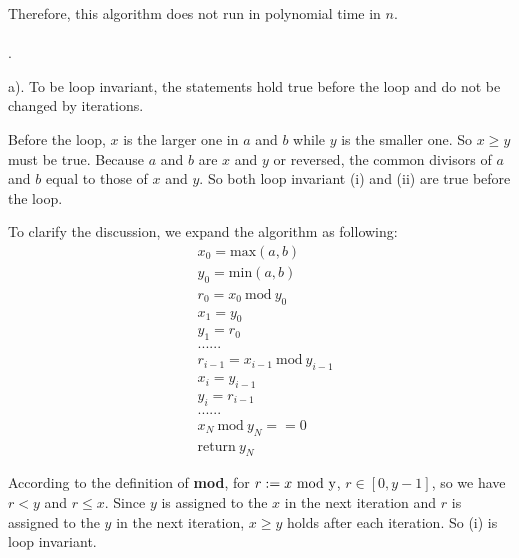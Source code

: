 \documentclass[twoside,11pt]{homework}
\begin{document}
Therefore, this algorithm does not run in polynomial time in $n$.
\\\\

.

\noindent a).
To be loop invariant, the statements hold true before the loop and do not be changed by iterations.

Before the loop, $x$ is the larger one in $a$ and $b$ while $y$ is the smaller one. So $x \ge y$ must be true. 
Because $a$ and $b$ are $x$ and $y$ or reversed, the common divisors of $a$ and $b$ equal to those of $x$ and $y$.
So both loop invariant (i) and (ii) are true before the loop.

To clarify the discussion, we expand the algorithm as following:
%
\begin{equation}
\begin{split}
&x_0 = \mathrm{max} (a, b)\\
&y_0 = \mathrm{min} (a, b)\\
&r_0 = x_0 \ \mathrm{mod}\  y_0\\
&x_1 = y_0\\
&y_1 = r_0\\
&......\\
&r_{i-1} = x_{i-1} \ \mathrm{mod}\ y_{i-1}\\
&x_i = y_{i-1}\\
&y_i = r_{i-1}\\
&......\\
&x_N\ \mathrm{mod}\ y_N == 0\\
&\mathrm{return}\ y_N
\end{split}
\end{equation}



According to the definition of \textbf{mod}, for $r := x\  \rm{mod}\ y$, $r \in [0, y-1]$, so we have $r < y$ and $r \le x$.
Since $y$ is assigned to the $x$ in the next iteration and $r$ is assigned to the $y$ in the next iteration, $x \ge y$ holds after each iteration.
So (i) is loop invariant.
\end{document}

